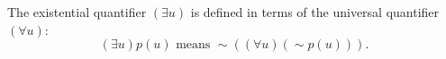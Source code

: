 The existential quantifier $(\exists u)$ is defined in terms of the universal quantifier $(\forall u)$:
$$(\exists u)p(u) \text{ means } \sim((\forall u)(\sim p(u))).$$